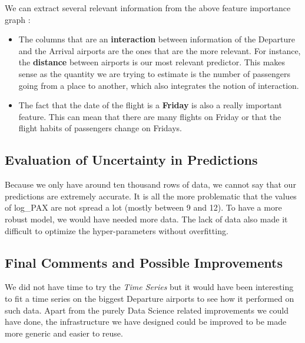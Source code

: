 \documentclass[a4paper,12pt,twoside]{article}
\begin{document}
We can extract several relevant information from the above feature importance graph :

\begin{itemize}
	\item The columns that are an \textbf{interaction} between information of the Departure and the Arrival airports are the ones that are the more relevant. For instance, the \textbf{distance} between airports is our most relevant predictor. This makes sense as the quantity we are trying to estimate is the number of passengers going from a place to another, which also integrates the notion of interaction.
	\item The fact that the date of the flight is a \textbf{Friday} is also a really important feature. This can mean that there are many flights on Friday or that the flight habits of passengers change on Fridays.
\end{itemize}

\subsection{Evaluation of Uncertainty in Predictions}

Because we only have around ten thousand rows of data, we cannot say that our predictions are extremely accurate. It is all the more problematic that the values of log\_PAX are not spread a lot (mostly between 9 and 12). To have a more robust model, we would have needed more data. The lack of data also made it difficult to optimize the hyper-parameters without overfitting.


\subsection{Final Comments and Possible Improvements}

We did not have time to try the \textit{Time Series} but it would have been interesting to fit a time series on the biggest Departure airports to see how it performed on such data.
Apart from the purely Data Science related improvements we could have done, the infrastructure we have designed could be improved to be made more generic and easier to reuse.
\end{document}
